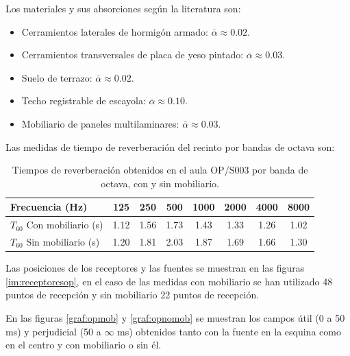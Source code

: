 Los materiales y sus absorciones según la literatura son:
\begin{itemize}
\itemsep0em
  \item Cerramientos laterales de hormigón armado: $\overline{\alpha}\approx0.02$.
  \item Cerramientos transversales de placa de yeso pintado: $\overline{\alpha}\approx0.03$.
  \item Suelo de terrazo: $\overline{\alpha}\approx0.02$.
  \item Techo registrable de escayola: $\overline{\alpha}\approx0.10$.
  \item Mobiliario de paneles multilaminares: $\overline{\alpha}\approx0.03$.
\end{itemize}

Las medidas de tiempo de reverberación del recinto por bandas de octava son:

\begin{table}[ht]
\centering
{
\begin{tabular}{@{}lccccccc@{}}
\toprule
Frecuencia (Hz) & 125 & 250 & 500 & 1000 & 2000 & 4000 & 8000 \\ \midrule
$T_{60}$ Con mobiliario (s) & 1.12 & 1.56 & 1.73 & 1.43 & 1.33 & 1.26 & 1.02 \\
$T_{60}$ Sin mobiliario (s) & 1.20 & 1.81 & 2.03 & 1.87 & 1.69 & 1.66 & 1.30 \\ \bottomrule
\end{tabular}
}
\caption{Tiempos de reverberación obtenidos en el aula OP/S003 por banda de octava, con y sin mobiliario.}
\label{tab:revop}
\end{table}

Las posiciones de los receptores y las fuentes se muestran en las figuras \ref{im:receptoresop}, en el caso de las medidas con mobiliario se han utilizado 48 puntos de recepción y sin mobiliario 22 puntos de recepción.

En las figuras \ref{graf:opmob} y \ref{graf:opnomob} se muestran los campos útil (0 a 50 ms) y perjudicial (50 a $\infty$ ms) obtenidos tanto con la fuente en la esquina como en el centro y con mobiliario o sin él.

